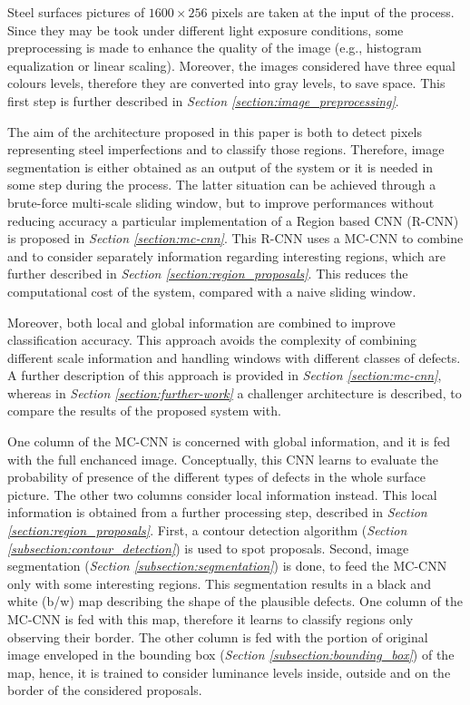     \par{
        Steel surfaces pictures of $1600\times 256$ pixels are taken at the input of the process. Since they may be took under different light exposure conditions, some preprocessing is made to enhance the quality of the image (e.g., histogram equalization or linear scaling). Moreover, the images considered have three equal colours levels, therefore they are converted into gray levels, to save space. This first step is further described in \emph{Section \ref{section:image_preprocessing}}.
    }
    \par{
        The aim of the architecture proposed in this paper is both to detect pixels representing steel imperfections and to classify those regions. Therefore, image segmentation is either obtained as an output of the system or it is needed in some step during the process. The latter situation can be achieved through a brute-force multi-scale sliding window, but to improve performances without reducing accuracy a particular implementation of a Region based CNN (R-CNN) \cite{ieee:7410526,ieee:7532516} is proposed in \emph{Section \ref{section:mc-cnn}}. This R-CNN uses a MC-CNN to combine and to consider separately information regarding interesting regions, which are further described in \emph{Section \ref{section:region_proposals}}. This reduces the computational cost of the system, compared with a naive sliding window.
    }
    \par{
        Moreover, both local and global information are combined to improve classification accuracy. This approach avoids the complexity of combining different scale information and handling windows with different classes of defects. A further description of this approach is provided in \emph{Section \ref{section:mc-cnn}}, whereas in \emph{Section \ref{section:further-work}} a challenger architecture is described, to compare the results of the proposed system with.
    }
    \par{
        One column of the MC-CNN is concerned with global information, and it is fed with the full enchanced image. Conceptually, this CNN learns to evaluate the probability of presence of the different types of defects in the whole surface picture. The other two columns consider local information instead. This local information is obtained from a further processing step, described in \emph{Section \ref{section:region_proposals}}. First, a contour detection algorithm (\emph{Section \ref{subsection:contour_detection}}) is used to spot proposals. Second, image segmentation (\emph{Section \ref{subsection:segmentation}}) is done, to feed the MC-CNN only with some interesting regions. This segmentation results in a black and white (b/w) map describing the shape of the plausible defects. One column of the MC-CNN is fed with this map, therefore it learns to classify regions only observing their border. The other column is fed with the portion of original image enveloped in the bounding box (\emph{Section \ref{subsection:bounding_box}}) of the map, hence, it is trained to consider luminance levels inside, outside and on the border of the considered proposals.
    }
